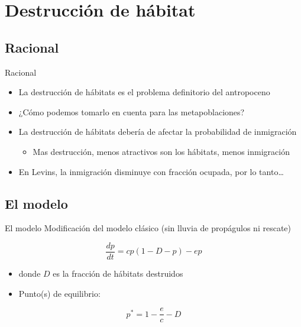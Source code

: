 \documentclass[
  11pt,
  ignorenonframetext,
]{beamer}
\providecommand{\tightlist}{%
  \setlength{\itemsep}{0pt}\setlength{\parskip}{0pt}}
\begin{document}
\section{Destrucción de hábitat}\label{destrucciuxf3n-de-huxe1bitat}

\subsection{Racional}\label{racional-1}

\begin{frame}{Racional}
\begin{itemize}
\item
  La destrucción de hábitats es el problema definitorio del antropoceno
\item
  ¿Cómo podemos tomarlo en cuenta para las metapoblaciones?
\item
  La destrucción de hábitats debería de afectar la probabilidad de
  inmigración

  \begin{itemize}
  \tightlist
  \item
    Mas destrucción, menos atractivos son los hábitats, menos
    inmigración
  \end{itemize}
\item
  En Levins, la inmigración disminuye con fracción ocupada, por lo
  tanto\ldots{}
\end{itemize}
\end{frame}

\subsection{El modelo}\label{el-modelo}

\begin{frame}{El modelo}
Modificación del modelo clásico (sin lluvia de propágulos ni rescate)

\[\frac{dp}{dt} = cp(1-D-p) - ep\]

\begin{itemize}
\item
  donde \(D\) es la fracción de hábitats destruidos
\item
  Punto(s) de equilibrio:
\end{itemize}

\[p^* = 1 - \frac{e}{c} - D\]
\end{frame}
\end{document}
